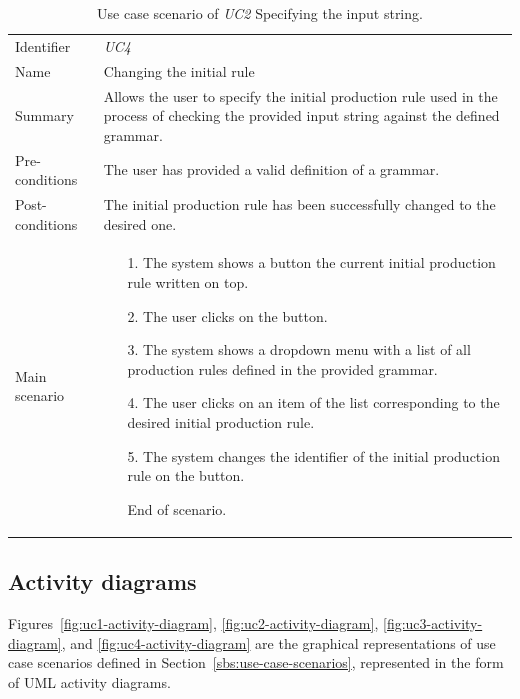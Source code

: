 \documentclass[english,bachelors,forcepolishlogotype]{wizthesis}
\begin{document}
\begin{xltabular}{\textwidth}{@{}L{3cm}X@{}}
  \caption{Use case scenario of \emph{UC2} Specifying the input string.}
  \label{tab:uc4-scenario}\\
  \toprule
  \endfirsthead
  \endhead
  \endfoot
  \endlastfoot
  Identifier & \emph{UC4} \\
  \addlinespace[0.5em] Name & Changing the initial rule \\
  \addlinespace[0.5em] Summary & Allows the user to specify the initial
  production rule used in the process of checking the provided input string
  against the defined grammar. \\
  \addlinespace[0.5em] Pre-conditions & The user has provided a valid definition
  of a grammar. \\
  \addlinespace[0.5em] Post-conditions & The initial production rule has been
  successfully changed to the desired one. \\
  \addlinespace[0.5em] Main scenario &
  \begin{enumerate}[noitemsep,nolistsep,labelindent=0.5cm,align=right]
    \item [1.] The system shows a button the current initial production rule
    written on top.
    \item [2.] The user clicks on the button.
    \item [3.] The system shows a dropdown menu with a list of all production
    rules defined in the provided grammar.
    \item [4.] The user clicks on an item of the list corresponding to the
    desired initial production rule.
    \item [5.] The system changes the identifier of the initial production rule
    on the button.
    \item [] End of scenario.
  \end{enumerate} \\* \bottomrule
\end{xltabular}

\subsection{Activity diagrams}

Figures~\ref{fig:uc1-activity-diagram}, \ref{fig:uc2-activity-diagram},
\ref{fig:uc3-activity-diagram}, and \ref{fig:uc4-activity-diagram} are the
graphical representations of use case scenarios defined in
Section~\ref{sbs:use-case-scenarios}, represented in the form of UML activity
diagrams.
\end{document}
